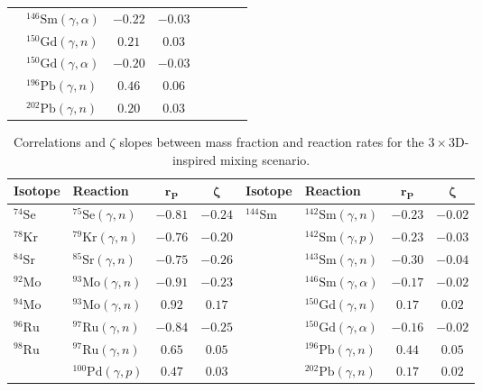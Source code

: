 \begin{table}
\begin{tabular}{llcc|llcc}
    $ $ & $^{146}\mathrm{Sm}(\gamma,\alpha)$ & $-0.22$ & $-0.03$ & $ $ & $ $ &  &  \\ 
    $ $ & $^{150}\mathrm{Gd}(\gamma,n)$ & $0.21$ & $0.03$ & $ $ & $ $ &  &  \\ 
    $ $ & $^{150}\mathrm{Gd}(\gamma,\alpha)$ & $-0.20$ & $-0.03$ & $ $ & $ $ &  &  \\ 
    $ $ & $^{196}\mathrm{Pb}(\gamma,n)$ & $0.46$ & $0.06$ & $ $ & $ $ &  &  \\ 
    $ $ & $^{202}\mathrm{Pb}(\gamma,n)$ & $0.20$ & $0.03$ & $ $ & $ $ &  &  \\ 
    \toprule
    \end{tabular}
\end{table}

\begin{table}
\caption{Correlations and $\zeta$ slopes between mass fraction and reaction rates for the $3\times$3D-inspired mixing scenario.
\label{tab:3x3d_corr}}
\scriptsize
    \begin{tabular}{llcc|llcc}
    \toprule
    \textbf{Isotope} & \textbf{Reaction} & $\mathbf{r_\mathrm{\mathbf{P}}}$ & $\mathbf{\zeta}$ & \textbf{Isotope} & \textbf{Reaction} & $\mathbf{r_\mathrm{\mathbf{P}}}$ & $\mathbf{\zeta}$ \\ 
    \toprule
    $^{74}\mathrm{Se}$ & $^{75}\mathrm{Se}(\gamma,n)$ & $-0.81$ & $-0.24$ & $^{144}\mathrm{Sm}$ & $^{142}\mathrm{Sm}(\gamma,n)$ & $-0.23$ & $-0.02$ \\ 
    $^{78}\mathrm{Kr}$ & $^{79}\mathrm{Kr}(\gamma,n)$ & $-0.76$ & $-0.20$ & $ $ & $^{142}\mathrm{Sm}(\gamma,p)$ & $-0.23$ & $-0.03$ \\ 
    $^{84}\mathrm{Sr}$ & $^{85}\mathrm{Sr}(\gamma,n)$ & $-0.75$ & $-0.26$ & $ $ & $^{143}\mathrm{Sm}(\gamma,n)$ & $-0.30$ & $-0.04$ \\ 
    $^{92}\mathrm{Mo}$ & $^{93}\mathrm{Mo}(\gamma,n)$ & $-0.91$ & $-0.23$ & $ $ & $^{146}\mathrm{Sm}(\gamma,\alpha)$ & $-0.17$ & $-0.02$ \\ 
    $^{94}\mathrm{Mo}$ & $^{93}\mathrm{Mo}(\gamma,n)$ & $0.92$ & $0.17$ & $ $ & $^{150}\mathrm{Gd}(\gamma,n)$ & $0.17$ & $0.02$ \\ 
    $^{96}\mathrm{Ru}$ & $^{97}\mathrm{Ru}(\gamma,n)$ & $-0.84$ & $-0.25$ & $ $ & $^{150}\mathrm{Gd}(\gamma,\alpha)$ & $-0.16$ & $-0.02$ \\ 
    $^{98}\mathrm{Ru}$ & $^{97}\mathrm{Ru}(\gamma,n)$ & $0.65$ & $0.05$ & $ $ & $^{196}\mathrm{Pb}(\gamma,n)$ & $0.44$ & $0.05$ \\ 
    $ $ & $^{100}\mathrm{Pd}(\gamma,p)$ & $0.47$ & $0.03$ & $ $ & $^{202}\mathrm{Pb}(\gamma,n)$ & $0.17$ & $0.02$ \\ 

\end{tabular}
\end{table}
